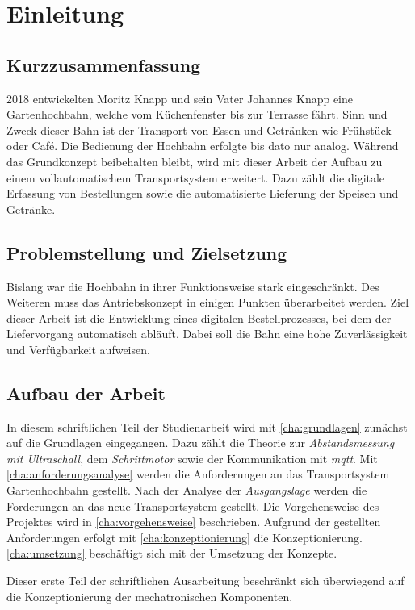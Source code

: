 
\chapter{Einleitung}

\section{Kurzzusammenfassung}
2018 entwickelten Moritz Knapp und sein Vater Johannes Knapp eine Gartenhochbahn, welche vom Küchenfenster bis zur Terrasse fährt. 
Sinn und Zweck dieser Bahn ist der Transport von Essen und Getränken wie Frühstück oder Café. Die Bedienung der Hochbahn erfolgte bis dato nur analog. Während das Grundkonzept beibehalten bleibt, wird mit dieser Arbeit der Aufbau zu einem vollautomatischem Transportsystem erweitert. Dazu zählt die digitale Erfassung von Bestellungen sowie die automatisierte Lieferung der Speisen  und Getränke. 

\section{Problemstellung und Zielsetzung}
    
Bislang war die Hochbahn in ihrer Funktionsweise stark eingeschränkt. Des Weiteren muss das Antriebskonzept in einigen Punkten überarbeitet werden. Ziel dieser Arbeit ist die Entwicklung eines digitalen Bestellprozesses, bei dem der Liefervorgang automatisch abläuft. Dabei soll die Bahn eine hohe Zuverlässigkeit und Verfügbarkeit aufweisen. 
\newpage

\section{Aufbau der Arbeit}
In diesem schriftlichen Teil der Studienarbeit wird mit \autoref{cha:grundlagen} zunächst auf die Grundlagen eingegangen. Dazu zählt die Theorie zur \textit{Abstandsmessung mit Ultraschall}, dem \textit{Schrittmotor} sowie der Kommunikation mit \textit{\acrshort{mqtt}}. 
Mit \autoref{cha:anforderungsanalyse} werden die Anforderungen an das Transportsystem Gartenhochbahn gestellt. Nach der Analyse der \textit{Ausgangslage} werden die Forderungen an das neue Transportsystem gestellt. Die Vorgehensweise des Projektes wird in \autoref{cha:vorgehensweise} beschrieben. Aufgrund der gestellten Anforderungen erfolgt mit \autoref{cha:konzeptionierung} die Konzeptionierung. \autoref{cha:umsetzung} beschäftigt sich mit der Umsetzung der Konzepte. 

Dieser erste Teil der schriftlichen Ausarbeitung beschränkt sich überwiegend auf die Konzeptionierung der mechatronischen Komponenten. 




